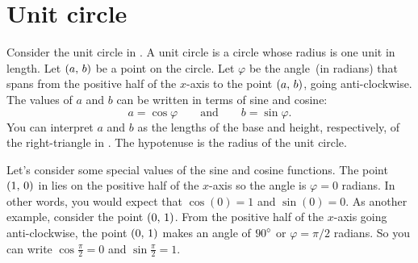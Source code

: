 \documentclass[a4paper,oneside,12pt]{article}
\begin{document}

\section{Unit circle}

Consider the unit circle in .  A unit
circle is a circle whose radius is one unit in length.  Let
$\left\lparen{a},\, {b}\right\rparen$ be a point on the circle.  Let $\varphi$ be the
angle~(in radians) that spans from the positive half of the $x$-axis
to the point $\left\lparen{a},\, {b}\right\rparen$, going anti-clockwise.  The values of $a$
and $b$ can be written in terms of sine and cosine:
\begin{equation}
\label{eqn:value_of_x_y_on_unit_circle}
a = \cos\varphi
\qquad\text{and}\qquad
b = \sin\varphi.
\end{equation}
You can interpret $a$ and $b$ as the lengths of the base and height,
respectively, of the right-triangle in
.  The hypotenuse is the radius of
the unit circle.

Let's consider some special values of the sine and cosine functions.
The point $\left\lparen{1},\, {0}\right\rparen$ in  lies on
the positive half of the $x$-axis so the angle is $\varphi = 0$
radians.  In other words, you would expect that $\cos(0) = 1$ and
$\sin(0) = 0$.  As another example, consider the point $\left\lparen{0},\, {1}\right\rparen$.
From the positive half of the $x$-axis going anti-clockwise, the point
$\left\lparen{0},\, {1}\right\rparen$ makes an angle of ${90}^{\circ}$ or $\varphi = \pi / 2$
radians.  So you can write $\cos\frac{\pi}{2} = 0$ and
$\sin\frac{\pi}{2} = 1$.
\end{document}
